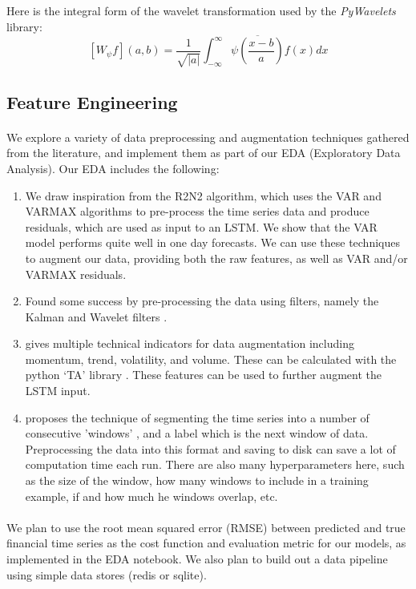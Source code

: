 \documentclass{article}
\begin{document}
\item Here is the integral form of the wavelet transformation used by the \textit{PyWavelets} library:
\[\left[W_\psi f\right](a, b) = \frac{1}{\sqrt{|a|}} \int_{-\infty}^\infty \overline{\psi\left(\frac{x-b}{a}\right)}f(x)dx\]

\subsection{Feature Engineering}

\paragraph{}
We explore a variety of data preprocessing and augmentation techniques gathered from the literature, and implement them as part of our EDA (Exploratory Data Analysis). Our EDA includes the following:

\begin{enumerate}
\item  We draw inspiration from the R2N2 \cite{1_website} algorithm, which uses the VAR and VARMAX algorithms to pre-process the time series data and produce residuals, which are used as input to an LSTM. We show that the VAR model performs quite well in one day forecasts. We can use these techniques to augment our data, providing both the raw features, as well as VAR and/or VARMAX residuals.

\item Found some success by pre-processing the data using filters, namely the Kalman and Wavelet filters \cite{2_website}.

\item \cite{3_website} gives multiple technical indicators for data augmentation including momentum, trend, volatility, and volume. These can be calculated with the python ‘TA’ library . These features can be used to further augment the LSTM input.

\item \cite{4_website} proposes the technique of segmenting the time series into a number of consecutive 'windows'  , and a label which is the next window of data. Preprocessing the data into this format and saving to disk can save a lot of computation time each run. There are also many hyperparameters here, such as the size of the window, how many windows to include in a training example, if and how much he windows overlap, etc.
\end{enumerate}

\paragraph{}
We plan to use the root mean squared error (RMSE) between predicted and true financial time series as the cost function and evaluation metric for our models, as implemented in the EDA notebook. We also plan to build out a data pipeline using simple data stores (redis or sqlite).
\end{document}
